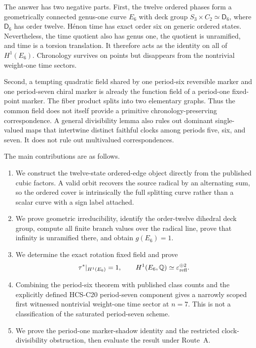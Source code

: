 The answer has two negative parts.  First, the twelve ordered phases form a
geometrically connected genus-one curve $E_6$ with deck group
$S_3\times C_2\simeq\mathsf D_6$, where $\mathsf D_6$ has order twelve.
H\'enon time has exact order six on generic ordered states.  Nevertheless,
the time quotient also has genus one, the quotient is unramified, and time
is a torsion translation.  It therefore acts as the identity on all of
$H^1(E_6)$.  Chronology survives on points but disappears from the
nontrivial weight-one time sectors.

Second, a tempting quadratic field shared by one period-six reversible
marker and one period-seven chiral marker is already the function field of a
period-one fixed-point marker.  The fiber product splits into two elementary
graphs.  Thus the common field does not itself provide a primitive
chronology-preserving correspondence.  A general divisibility lemma also
rules out dominant single-valued maps that intertwine distinct faithful
clocks among periods five, six, and seven.  It does not rule out multivalued
correspondences.

The main contributions are as follows.
\begin{enumerate}
 \item We construct the twelve-state ordered-edge object directly from the
 published cubic factors.  A valid orbit recovers the source radical by an
 alternating sum, so the ordered cover is intrinsically the full splitting
 curve rather than a scalar curve with a sign label attached.
 \item We prove geometric irreducibility, identify the order-twelve
 dihedral deck group, compute all finite branch values over the radical
 line, prove that infinity is unramified there, and obtain $g(E_6)=1$.
 \item We determine the exact rotation fixed field and prove
 \[
  \tau^*|_{H^1(E_6)}=1,
  \qquad
  H^1(E_6,\mathbb Q)\simeq\varepsilon_{\mathrm{refl}}^{\oplus2}.
 \]
 \item Combining the period-six theorem with published class counts and the
 explicitly defined HCS-C20 period-seven component gives a narrowly scoped
 first witnessed nontrivial weight-one time sector at $n=7$.  This is not a
 classification of the saturated period-seven scheme.
 \item We prove the period-one marker-shadow identity and the restricted
 clock-divisibility obstruction, then evaluate the result under Route~A.
\end{enumerate}

